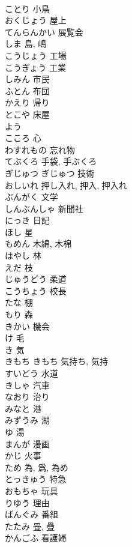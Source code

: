 \documentclass[8pt]{extreport}
\begin{document}
\begin{CJK}{UTF8}{min}
\\	ことり	小鳥
\\	おくじょう	屋上
\\	てんらんかい	展覧会
\\	しま	島, 嶋
\\	こうじょう	工場
\\	こうぎょう	工業
\\	しみん	市民
\\	ふとん	布団
\\	かえり	帰り
\\	とこや	床屋
\\	よう	
\\	こころ	心
\\	わすれもの	忘れ物
\\	てぶくろ	手袋, 手ぶくろ
\\	ぎじゅつ		ぎじゅつ	技術
\\	おしいれ	押し入れ, 押入, 押入れ
\\	ぶんがく	文学
\\	しんぶんしゃ	新聞社
\\	にっき	日記
\\	ほし	星
\\	もめん	木綿, 木棉
\\	はやし	林
\\	えだ	枝
\\	じゅうどう	柔道
\\	こうちょう	校長
\\	たな	棚
\\	もり	森
\\	きかい	機会
\\	け	毛
\\	き	気
\\	きもち		きもち	気持ち, 気持
\\	すいどう	水道
\\	きしゃ	汽車
\\	なおり	治り
\\	みなと	港
\\	みずうみ	湖
\\	ゆ	湯
\\	まんが	漫画
\\	かじ	火事
\\	ため	為, 爲, 為め
\\	とっきゅう	特急
\\	おもちゃ	玩具
\\	りゆう	理由
\\	ばんぐみ	番組
\\	たたみ	畳, 疊
\\	かんごふ	看護婦

\end{CJK}
\end{document}
